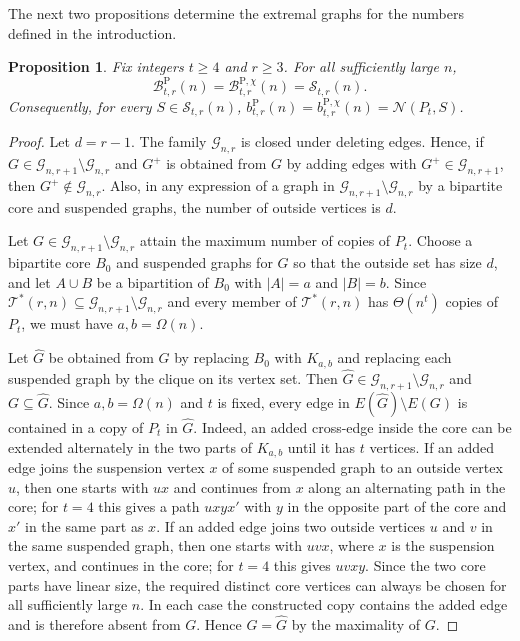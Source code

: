 \documentclass[11pt]{article}
\newtheorem{proposition}[theorem]{Proposition}
\theoremstyle{definition}
\theoremstyle{plain}
\theoremstyle{remark}
\theoremstyle{plain}
\numberwithin{equation}{section}
\newcommand{\cG}{\mathcal G}
\newcommand{\cB}{\mathcal B}
\newcommand{\cS}{\mathcal S}
\newcommand{\cT}{\mathcal T}
\newcommand{\N}{\mathcal N}
\begin{document}
The next two propositions determine the extremal graphs for the numbers defined in the introduction.

\begin{proposition}\label{prop:path-extremal}
Fix integers $t\ge4$ and $r\ge3$. For all sufficiently large $n$,
\[
        \cB^{\mathrm P}_{t,r}(n)=\cB^{\mathrm P,\chi}_{t,r}(n)=\cS_{t,r}(n).
\]
Consequently, for every $S\in\cS_{t,r}(n)$, $b^{\mathrm P}_{t,r}(n)=b^{\mathrm P,\chi}_{t,r}(n)=\N(P_t,S)$.
\end{proposition}

\begin{proof}
Let $d=r-1$. The family $\cG_{n,r}$ is closed under deleting edges. Hence, if $G\in\cG_{n,r+1}\setminus\cG_{n,r}$ and $G^+$ is obtained from $G$ by adding edges with $G^+\in\cG_{n,r+1}$, then $G^+\notin\cG_{n,r}$. Also, in any expression of a graph in $\cG_{n,r+1}\setminus\cG_{n,r}$ by a bipartite core and suspended graphs, the number of outside vertices is $d$.

Let $G\in\cG_{n,r+1}\setminus\cG_{n,r}$ attain the maximum number of copies of $P_t$. Choose a bipartite core $B_0$ and suspended graphs for $G$ so that the outside set has size $d$, and let $A\cup B$ be a bipartition of $B_0$ with $|A|=a$ and $|B|=b$. Since $\cT^*(r,n)\subseteq\cG_{n,r+1}\setminus\cG_{n,r}$ and every member of $\cT^*(r,n)$ has $\Theta(n^t)$ copies of $P_t$, we must have $a,b=\Omega(n)$.

Let $\widehat G$ be obtained from $G$ by replacing $B_0$ with $K_{a,b}$ and replacing each suspended graph by the clique on its vertex set. Then $\widehat G\in\cG_{n,r+1}\setminus\cG_{n,r}$ and $G\subseteq\widehat G$. Since $a,b=\Omega(n)$ and $t$ is fixed, every edge in $E(\widehat G)\setminus E(G)$ is contained in a copy of $P_t$ in $\widehat G$. Indeed, an added cross-edge inside the core can be extended alternately in the two parts of $K_{a,b}$ until it has $t$ vertices. If an added edge joins the suspension vertex $x$ of some suspended graph to an outside vertex $u$, then one starts with $u x$ and continues from $x$ along an alternating path in the core; for $t=4$ this gives a path $u x y x'$ with $y$ in the opposite part of the core and $x'$ in the same part as $x$. If an added edge joins two outside vertices $u$ and $v$ in the same suspended graph, then one starts with $u v x$, where $x$ is the suspension vertex, and continues in the core; for $t=4$ this gives $u v x y$. Since the two core parts have linear size, the required distinct core vertices can always be chosen for all sufficiently large $n$. In each case the constructed copy contains the added edge and is therefore absent from $G$. Hence $G=\widehat G$ by the maximality of $G$.


\end{proof}
\end{document}
